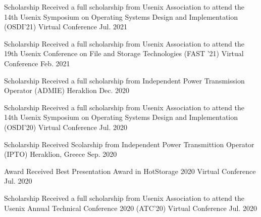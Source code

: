 

\begin{cvhonors}
  \cvhonor
    {Scholarship} %
	{Received a full scholarship from Usenix Association to attend the
	14th Usenix Symposium on Operating Systems Design and
Implementation (OSDI'21)} %
    {Virtual Conference} %
    {Jul. 2021} %

  \cvhonor
    {Scholarship} %
	{Received a full scholarship from Usenix Association to attend the
	19th Usenix Conference on File and Storage Technologies (FAST '21)
	} %
    {Virtual Conference} %
    {Feb. 2021} %

  \cvhonor
    {Scholarship} %
	{Received a full scholarship from Independent Power Transmission
	Operator (ADMIE)} %
    {Heraklion} %
    {Dec. 2020} %

  \cvhonor
    {Scholarship} %
	{Received a full scholarship from Usenix Association to attend the
	14th Usenix Symposium on Operating Systems Design and
Implementation (OSDI'20)} %
    {Virtual Conference} %
    {Jul. 2020} %

  \cvhonor
    {Scholarship} %
	{Received Scolarship from Independent Power Transmittion Operator
	(IPTO)} %
    {Heraklion, Greece} %
    {Sep. 2020} %

  \cvhonor
    {Award} %
    {Received Best Presentation Award in HotStorage 2020} %
    {Virtual Conference} %
    {Jul. 2020} %

  \cvhonor
    {Scholarship} %
    {Received a full scholarship from Usenix Association to attend the
    Usenix Annual Technical Conference 2020 (ATC'20)} %
    {Virtual Conference} %
    {Jul. 2020} %


\end{cvhonors}
